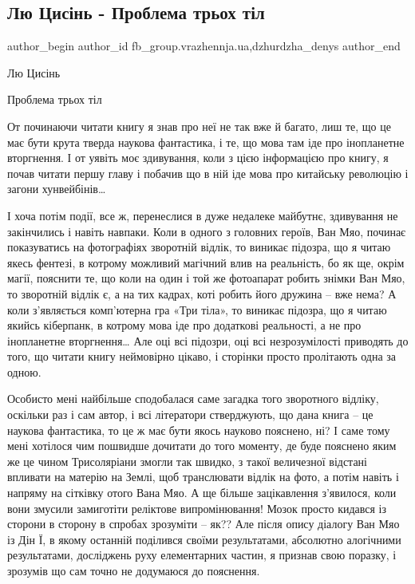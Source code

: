  
 
 
 
 
 
\subsection{Лю Цисінь - Проблема трьох тіл}
\label{sec:17_08_2022.fb.fb_group.vrazhennja.ua.1.problema_trjoh_til}
 
\ifcmt
 author_begin
   author_id fb_group.vrazhennja.ua,dzhurdzha_denys
 author_end
\fi

Лю Цисінь

Проблема трьох тіл

От починаючи читати книгу я знав про неї не так вже й багато, лиш те, що це має
бути крута тверда наукова фантастика, і те, що мова там іде про інопланетне
вторгнення. І от уявіть моє здивування, коли з цією інформацією про книгу, я
почав читати першу главу і побачив що в ній іде мова про китайську революцію і
загони хунвейбінів…

І хоча потім події, все ж, перенеслися в дуже недалеке майбутнє, здивування не
закінчились і навіть навпаки. Коли в одного з головних героїв, Ван Мяо, починає
показуватись на фотографіях зворотній відлік, то виникає підозра, що я читаю
якесь фентезі, в котрому можливий магічний влив на реальність, бо як ще, окрім
магії, пояснити те, що коли на один і той же фотоапарат робить знімки Ван Мяо,
то зворотній відлік є, а на тих кадрах, коті робить його дружина – вже нема? А
коли з'являється комп'ютерна гра «Три тіла», то виникає підозра, що я читаю
якийсь кіберпанк, в котрому мова іде про додаткові реальності, а не про
інопланетне вторгнення… Але оці всі підозри, оці всі незрозумілості приводять
до того, що читати книгу неймовірно цікаво, і сторінки просто пролітають одна
за одною.

Особисто мені найбільше сподобалася саме загадка того зворотного відліку,
оскільки раз і сам автор, і всі літератори стверджують, що дана книга – це
наукова фантастика, то це ж має бути якось науково пояснено, ні? І саме тому
мені хотілося чим пошвидше дочитати до того моменту, де буде пояснено яким же
це чином Трисоляріани змогли так швидко, з такої величезної відстані впливати
на матерію на Землі, щоб транслювати відлік на фото, а потім навіть і напряму
на сітківку отого Вана Мяо. А ще більше зацікавлення з'явилося, коли вони
змусили замиготіти реліктове випромінювання! Мозок просто кидався із сторони в
сторону в спробах зрозуміти – як?? Але після опису діалогу Ван Мяо із Дін Ї, в
якому останній поділився своїми результатами, абсолютно алогічними
результатами, досліджень руху елементарних частин, я признав свою поразку, і
зрозумів що сам точно не додумаюся до пояснення.


